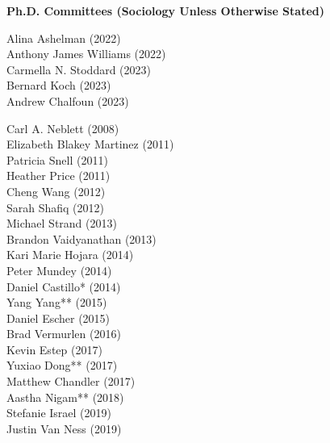 \medskip
\noindent \textbf{Ph.D. Committees (Sociology Unless Otherwise Stated)} 

\begin{multicols}{2} \noindent
    Alina Ashelman (2022) \\
    Anthony James Williams (2022) \\
    Carmella N. Stoddard (2023) \\
    Bernard Koch (2023) \\
    Andrew Chalfoun (2023) 
\end{multicols}

\newpage
{}
\begin{multicols}{2}
\noindent
    Carl A. Neblett (2008) \\
    Elizabeth Blakey Martinez (2011) \\
    Patricia Snell (2011) \\
    Heather Price (2011) \\
    Cheng Wang (2012) \\
    Sarah Shafiq (2012) \\
    Michael Strand (2013) \\
    Brandon Vaidyanathan (2013) \\
    Kari Marie Hojara (2014) \\
    Peter Mundey (2014) \\
    Daniel Castillo\textcolor{uclablue}{*} (2014)  \\
    Yang Yang\textcolor{uclablue}{**} (2015) \\
    Daniel Escher (2015) \\
    Brad Vermurlen (2016) \\
    Kevin Estep (2017) \\
    Yuxiao Dong\textcolor{uclablue}{**}  (2017) \\
    Matthew Chandler (2017) \\
    Aastha Nigam\textcolor{uclablue}{**}  (2018) \\
    Stefanie Israel (2019) \\
    Justin Van Ness (2019) 
\end{multicols}